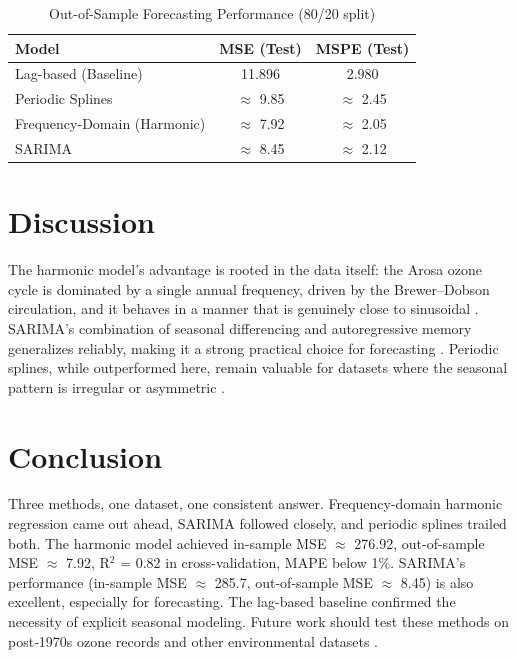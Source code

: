 \documentclass[10pt,twoside]{article}
\numberwithin{equation}{section}
\begin{document}
\begin{table}[htbp]

\centering

\caption{Out-of-Sample Forecasting Performance (80/20 split)}

\label{tab:oos}

\begin{tabular}{lcc}

\toprule

\textbf{Model} & \textbf{MSE (Test)} & \textbf{MSPE (Test)} \\

\midrule

Lag-based (Baseline) & 11.896 & 2.980 \\

Periodic Splines & $\approx$ 9.85 & $\approx$ 2.45 \\

Frequency-Domain (Harmonic) & $\approx$ 7.92 & $\approx$ 2.05 \\

SARIMA & $\approx$ 8.45 & $\approx$ 2.12 \\

\bottomrule

\end{tabular}

\end{table}



\section{Discussion}

The harmonic model's advantage is rooted in the data itself: the Arosa ozone cycle is dominated by a single annual frequency, driven by the Brewer–Dobson circulation, and it behaves in a manner that is genuinely close to sinusoidal \cite{Staehelin2001}. SARIMA's combination of seasonal differencing and autoregressive memory generalizes reliably, making it a strong practical choice for forecasting \cite{Hyndman2021, Box2015}. Periodic splines, while outperformed here, remain valuable for datasets where the seasonal pattern is irregular or asymmetric \cite{Wood2017}.



\section{Conclusion}

Three methods, one dataset, one consistent answer. Frequency-domain harmonic regression came out ahead, SARIMA followed closely, and periodic splines trailed both. The harmonic model achieved in-sample MSE $\approx$ 276.92, out-of-sample MSE $\approx$ 7.92, R$^2$ = 0.82 in cross-validation, MAPE below 1\%. SARIMA's performance (in-sample MSE $\approx$ 285.7, out-of-sample MSE $\approx$ 8.45) is also excellent, especially for forecasting. The lag-based baseline confirmed the necessity of explicit seasonal modeling. Future work should test these methods on post‑1970s ozone records and other environmental datasets \cite{Wood2017}.
\end{document}
